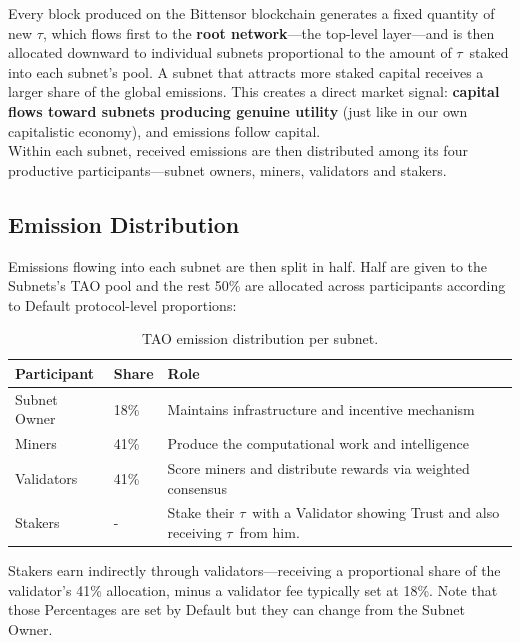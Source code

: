 \documentclass[12pt, a4paper, oneside]{report}
\newcommand{\TAO}{$\tau$}            %
\theoremstyle{definition}
\begin{document}
Every block produced on the Bittensor blockchain generates a fixed quantity of 
new \TAO, which flows first to the \textbf{root network}—the top-level  
layer—and is then allocated downward to individual subnets proportional to the 
amount of \TAO\ staked into each subnet's pool. A subnet that attracts more 
staked capital receives a larger share of the global emissions. This creates a 
direct market signal: \textbf{capital flows toward subnets producing genuine 
utility} (just like in our own capitalistic economy), and emissions follow capital.\\[0.4cm]

Within each subnet, received emissions are then distributed among its four 
productive participants—subnet owners, miners, validators and stakers.


\subsection{Emission Distribution}

Emissions flowing into each subnet are then split in half. Half are given to the Subnets's TAO pool and the rest 50\% are allocated across participants according to Default protocol-level proportions:

\begin{table}[H]
\centering
\renewcommand{\arraystretch}{1.6}
\begin{tabular}{p{3.5cm} p{2cm} p{7.5cm}}
\toprule
\textbf{Participant} & \textbf{Share} & \textbf{Role} \\
\midrule
Subnet Owner  & 18\% & Maintains infrastructure and incentive mechanism \\
Miners        & 41\% & Produce the computational work and intelligence \\
Validators    & 41\% & Score miners and distribute rewards via weighted consensus \\
Stakers       & -    & Stake their \TAO \ with a Validator showing Trust and also receiving \TAO\ from him.\\  
\bottomrule
\end{tabular}
\caption{TAO emission distribution per subnet.}
\label{tab:emissions}
\end{table}

\noindent Stakers earn indirectly through validators—receiving a proportional share 
of the validator's 41\% allocation, minus a validator fee typically set at 18\%. Note that those Percentages are set by Default but they can change from the Subnet Owner.
\end{document}
